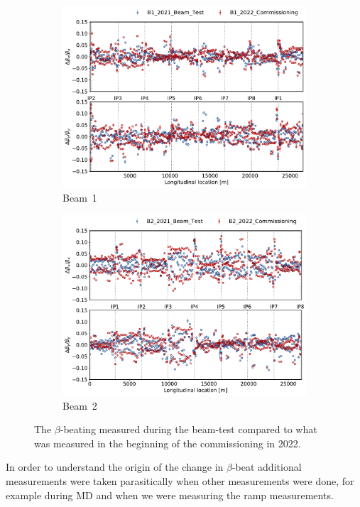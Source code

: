 \documentclass[a4paper]{cernatsnote}
\begin{document}
\begin{figure}[ht]
\begin{subfigure}{.5\textwidth}
  \centering
  \includegraphics[width=.8\linewidth]{plots/beam1/lhcb1_betabeat_vs_beamtest.pdf}  
  \caption{Beam~1}
\end{subfigure}
\begin{subfigure}{.5\textwidth}
  \centering
  \includegraphics[width=.8\linewidth]{plots/beam2/lhcb2_betabeat_vs_beamtest.pdf}  
  \caption{Beam~2}
\end{subfigure}
\caption{The $\beta$-beating measured during the beam-test compared to what was measured in the beginning of the commissioning in 2022.}
\label{fig:2021_beta_beat_vs_2022}
\end{figure}
In order to understand the origin of the change in $\beta$-beat additional measurements were taken parasitically when other measurements were done, for example during MD and when we were measuring the ramp measurements.  
\end{document}

